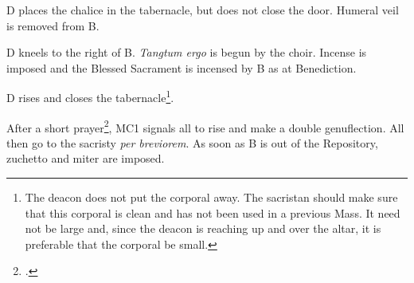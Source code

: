 \documentclass{report}
\begin{document}
\begin{multicols}{2}
    \rubric D places the chalice in the tabernacle, but does not close the
    door. Humeral veil is removed from B.

    \rubric D kneels to the right of B. \textit{Tangtum ergo} is begun by the
    choir. Incense is imposed and the Blessed Sacrament is incensed by B as at
    Benediction.

    \rubric D rises and closes the tabernacle\footnote{The deacon does not put
    the corporal away. The sacristan should make sure that this corporal is
    clean and has not been used in a previous Mass. It need not be large and,
    since the deacon is reaching up and over the altar, it is preferable that
    the corporal be small.}.

    \rubric After a short prayer\footcite[B is instructed to give a blessing at
    this point with miter and crozier. I assume that this is reserved to the
    Ordinary.][p. 192]{stehle}, MC1 signals all to rise and make a double
    genuflection. All then go to the sacristy \textit{per breviorem}. As soon
    as B is out of the Repository, zuchetto and miter are imposed.
    
\end{multicols}
\end{document}
